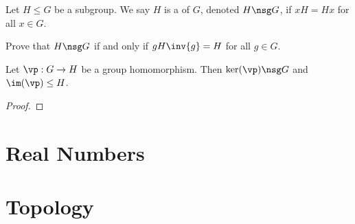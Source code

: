 \documentclass[10pt]{article}
\begin{document}
\begin{definition}
    Let $H\le G$ be a subgroup. We say $H$ is a  of $G$, denoted $H\nsg G$, if $xH=Hx$ for all $x\in G$.
\end{definition}
\begin{problem}
    Prove that $H\nsg G$ if and only if $gH\inv{g}=H$ for all $g\in G$.
\end{problem}
\begin{proposition}
    Let $\vp:G\to H$ be a group homomorphism. Then $\ker(\vp)\nsg G$ and $\im(\vp)\le H$.
\end{proposition}
\begin{proof}
    
\end{proof}

\newpage
\section{Real Numbers}
\newpage
\section{Topology}







\hindex
\end{document}
